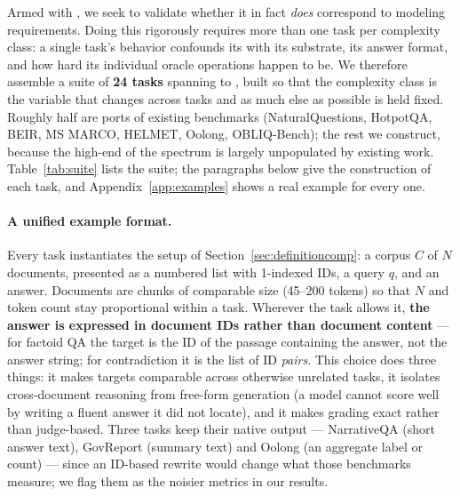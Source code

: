 Armed with \cname, we seek to validate whether it in fact \emph{does} correspond to modeling requirements. Doing this rigorously requires more than one task per complexity class: a single task's behavior confounds its \cname with its substrate, its answer format, and how hard its individual oracle operations happen to be. We therefore assemble a suite of \textbf{24 tasks} spanning  to , built so that the complexity class is the variable that changes across tasks and as much else as possible is held fixed. Roughly half are ports of existing benchmarks (NaturalQuestions, HotpotQA, BEIR, MS MARCO, HELMET, Oolong, OBLIQ-Bench); the rest we construct, because the high-\cname end of the spectrum is largely unpopulated by existing work. Table~\ref{tab:suite} lists the suite; the paragraphs below give the construction of each task, and Appendix~\ref{app:examples} shows a real example for every one.

\paragraph{A unified example format.} Every task instantiates the setup of Section~\ref{sec:definitioncomp}: a corpus $C$ of $N$ documents, presented as a numbered list with 1-indexed IDs, a query $q$, and an answer. Documents are chunks of comparable size (45--200 tokens) so that $N$ and token count stay proportional within a task. Wherever the task allows it, \textbf{the answer is expressed in document IDs rather than document content} --- for factoid QA the target is the ID of the passage containing the answer, not the answer string; for contradiction it is the list of ID \emph{pairs}. This choice does three things: it makes targets comparable across otherwise unrelated tasks, it isolates cross-document reasoning from free-form generation (a model cannot score well by writing a fluent answer it did not locate), and it makes grading exact rather than judge-based. Three tasks keep their native output --- NarrativeQA (short answer text), GovReport (summary text) and Oolong (an aggregate label or count) --- since an ID-based rewrite would change what those benchmarks measure; we flag them as the noisier metrics in our results.

